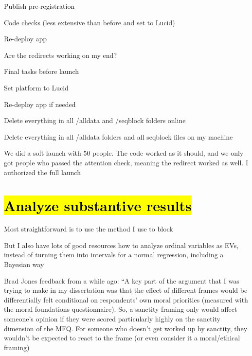 \documentclass[12pt]{article}
\begin{document}
\begin{coi}
\begin{coi}
				\item Publish pre-registration
			\end{coi}
		\item Code checks (less extensive than before and set to Lucid)
			\begin{coi}
				\item Re-deploy app
				\item Are the redirects working on my end?
			\end{coi}
		\item Final tasks before launch
			\begin{coi}
				\item Set platform to Lucid
				\item Re-deploy app if needed
				\item Delete everything in all /alldata and /seqblock folders online 
				\item Delete everything in all /alldata folders and all seqblock files on my machine
			\end{coi}
		\item We did a soft launch with 50 people. The code worked as it should, and we only got people who passed the attention check, meaning the redirect worked as well. I authorized the full launch			
	\end{coi}
	
\section*{\hl{Analyze substantive results}}
	\begin{coi}
		\item Most straightforward is to use the method I use to block
		\item But I also have lots of good resources how to analyze ordinal variables as EVs, instead of turning them into intervals for a normal regression, including a Bayesian way
		\item Brad Jones feedback from a while ago: ``A key part of the argument that I was trying to make in my dissertation was that the effect of different frames would be differentially felt conditional on respondents' own moral priorities (measured with the moral foundations questionnaire). So, a sanctity framing only would affect someone's opinion if they were scored particularly highly on the sanctity dimension of the MFQ. For someone who doesn't get worked up by sanctity, they wouldn't be expected to react to the frame (or even consider it a moral/ethical framing)
	\end{coi}
	
\end{document}
